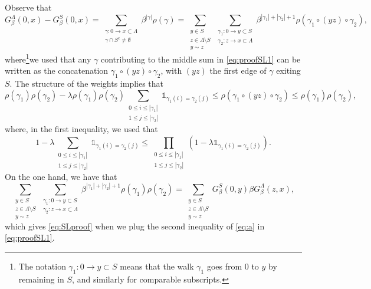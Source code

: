 \documentclass[11pt,a4paper]{article}
\numberwithin{equation}{section}
\theoremstyle{plain}
\theoremstyle{definition}
\begin{document}
Observe that
\begin{equation}\label{eq:proofSL1}
	G_\beta^{\Lambda}(0,x)-G_\beta^S(0,x)=\sum_{\substack{\gamma: 0 \rightarrow x\subset \Lambda\\ \gamma \cap S^c\neq \emptyset}}\beta^{|\gamma|}\rho(\gamma)=\sum_{\substack{y\in S\\ z\in \Lambda\setminus S\\ y\sim z}}\sum_{\substack{\gamma_1:0\rightarrow y\subset S\\ \gamma_2:z\rightarrow x\subset \Lambda}}\beta^{|\gamma_1|+|\gamma_2|+1}\rho(\gamma_1\circ(yz)\circ \gamma_2),
\end{equation}
where\footnote{The notation $\gamma_1:0\rightarrow y\subset S$ means that the walk $\gamma_1$ goes from 0 to $y$ by remaining in $S$, and similarly for comparable subscripts.}we used that any $\gamma$ contributing to the middle sum in \eqref{eq:proofSL1} can be written as the concatenation $\gamma_1\circ (yz)\circ \gamma_2$, with $(yz)$ the first edge of $\gamma$ exiting $S$. The structure of the weights implies that 
\begin{equation}\label{eq:a}
    \rho(\gamma_1)\rho(\gamma_2)- \lambda\rho(\gamma_1)\rho(\gamma_2) \sum_{\substack{0\leq i \leq |\gamma_1|\\1\leq j \leq |\gamma_2|}} \mathds{1}_{\gamma_1(i)=\gamma_2(j)} \le \rho(\gamma_1\circ(yz)\circ\gamma_2)\leq  \rho(\gamma_1)\rho(\gamma_2),
\end{equation}
where, in the first inequality, we used that 
\begin{equation}
   1-\lambda  \sum_{\substack{0\leq i \leq |\gamma_1|\\1\leq j \leq |\gamma_2|}} \mathds{1}_{\gamma_1(i)=\gamma_2(j)} \le  \prod_{\substack{0\leq i \leq |\gamma_1|\\1\leq j \leq |\gamma_2|}} (1-\lambda\mathds{1}_{\gamma_1(i)=\gamma_2(j)}).\end{equation}
On the one hand, we have that
\begin{equation}\label{eq:proofSL2}
	\sum_{\substack{y\in S\\ z\in \Lambda\setminus S\\ y\sim z}}\sum_{\substack{\gamma_1:0\rightarrow y\subset S\\ \gamma_2:z\rightarrow x\subset \Lambda}}\beta^{|\gamma_1|+|\gamma_2|+1}\rho(\gamma_1)\rho(\gamma_2)=\sum_{\substack{y\in S\\ z\in \Lambda\setminus S\\ y\sim z}}G_\beta^S(0,y)\beta G_\beta^\Lambda(z,x),
\end{equation}
which gives \eqref{eq:SLproof} when we plug the second inequality of \eqref{eq:a} in \eqref{eq:proofSL1}.
\end{document}

